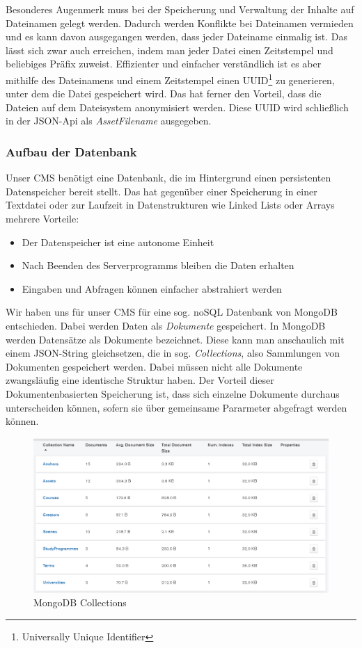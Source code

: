 \documentclass[titlepage, a4paper, 11pt]{scrartcl}
\begin{document}
        Besonderes Augenmerk muss bei der Speicherung und Verwaltung der Inhalte auf Dateinamen gelegt werden. Dadurch werden Konflikte bei Dateinamen vermieden und es kann
        davon ausgegangen werden, dass jeder Dateiname einmalig ist. Das lässt sich zwar auch erreichen, indem man jeder Datei einen Zeitstempel und beliebiges Präfix zuweist.
        Effizienter und einfacher verständlich ist es aber mithilfe des Dateinamens und einem Zeitstempel einen UUID\footnote{Universally Unique Identifier} zu generieren, unter dem die Datei gespeichert wird.
        Das hat ferner den Vorteil, dass die Dateien auf dem Dateisystem anonymisiert werden. Diese UUID wird schließlich in der JSON-Api als \textit{AssetFilename} ausgegeben.       

      \subsubsection{Aufbau der Datenbank}

        Unser CMS benötigt eine Datenbank, die im Hintergrund einen persistenten Datenspeicher bereit stellt.
        Das hat gegenüber einer Speicherung in einer Textdatei oder zur Laufzeit in Datenstrukturen wie Linked Lists oder Arrays mehrere Vorteile:

        \begin{itemize}
          \item Der Datenspeicher ist eine autonome Einheit
          \item Nach Beenden des Serverprogramms bleiben die Daten erhalten
          \item Eingaben und Abfragen können einfacher abstrahiert werden
        \end{itemize}

        Wir haben uns für unser CMS für eine sog. noSQL Datenbank von MongoDB entschieden. Dabei werden Daten als \textit{Dokumente} gespeichert. 
        In MongoDB werden Datensätze als Dokumente bezeichnet. Diese kann man anschaulich mit einem JSON-String gleichsetzen, die in sog. \textit{Collections},
        also Sammlungen von Dokumenten gespeichert werden. Dabei müssen nicht alle Dokumente zwangsläufig eine identische Struktur haben.
        Der Vorteil dieser Dokumentenbasierten Speicherung ist, dass sich einzelne Dokumente durchaus unterscheiden können, sofern sie über gemeinsame Pararmeter abgefragt werden können.

        \begin{figure}[H]
          \centering
          \includegraphics[width=.8\textwidth]{MongoDB.PNG}
          \caption{MongoDB Collections}
          \label{MongoCollection}
        \end{figure}
\end{document}
